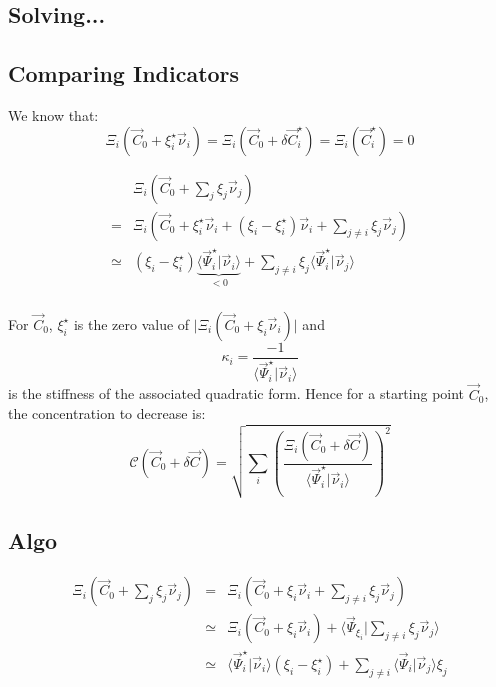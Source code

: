 \documentclass[aps,12pt]{revtex4}
\begin{document}
 
\subsection{Solving...}

\subsection{Comparing Indicators}
We know that:
\begin{equation}
	\Xi_i(\vec C_0 + \xi_i^\star \vec \nu _i) = \Xi_i(\vec C_0 + \delta \vec C_i^\star) = \Xi_i(\vec C_i^\star) = 0
\end{equation}

\begin{equation}
\begin{array}{rl}
 &	\Xi_i(\vec C_0 + \sum_j \xi_j \vec \nu_j) \\
= &	\Xi_i\left(\vec C_0 + \xi_i^\star \vec \nu_i + (\xi_i-\xi_i^\star) \vec \nu_i + \sum_{j\not=i} \xi_j \vec \nu_j\right)  \\
\simeq & (\xi_i-\xi_i^\star) \underbrace{\langle \vec \Psi_i^\star \vert \vec \nu_i \rangle}_{<0} + \sum_{j\not=i} \xi_j \langle \vec \Psi_i^\star \vert \vec \nu_j \rangle \\
\end{array}
\end{equation}

For $\vec C_0$, $\xi_i^\star$ is the zero value of $\vert \Xi_i(\vec C_0 + \xi_i \vec \nu _i) \vert$
and 
\begin{equation}
\kappa_i = \dfrac{-1}{ \langle \vec \Psi_i^\star \vert \vec \nu_i \rangle }
\end{equation}
is the stiffness of the associated quadratic form.
Hence for a starting point $\vec C_0$, the concentration to decrease is:
\begin{equation}
	\mathcal C(\vec C_0 + \delta \vec C) =
	\sqrt{ 
	\sum_i \left(\dfrac{\Xi_i(\vec C_0 + \delta \vec C) }{\langle \vec \Psi_i^\star \vert \vec \nu_i \rangle}\right)^2 
	}
\end{equation}


\subsection{Algo}

\begin{equation}
\begin{array}{rcl}
	\Xi_i(\vec C_0 + \sum_j \xi_j \vec \nu_j ) & = & \Xi_i(\vec C_0 + \xi_i \vec \nu_i + \sum_{j\not=i} \xi_j \vec \nu_j )\\
	& \simeq & \Xi_i(\vec C_0 + \xi_i \vec \nu_i) + \langle \vec \Psi_{\xi_i} \vert \sum_{j\not=i} \xi_j \vec \nu_j \rangle\\
	& \simeq & \langle \vec \Psi_i^\star \vert \vec \nu_i \rangle  (\xi_i-\xi_i^\star)   + \sum_{j\not=i} \langle \vec \Psi_i \vert \vec \nu_j \rangle \xi_j\\
\end{array}
\end{equation}
\end{document}
